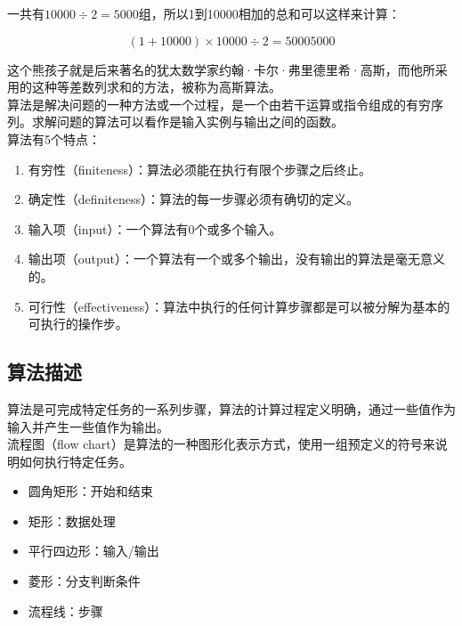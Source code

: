 一共有$ 10000 \div 2 = 5000 $组，所以1到10000相加的总和可以这样来计算：

$$
	(1 + 10000) \times 10000 \div 2 = 50005000
$$

这个熊孩子就是后来著名的犹太数学家约翰·卡尔·弗里德里希·高斯，而他所采用的这种等差数列求和的方法，被称为高斯算法。 \\

算法是解决问题的一种方法或一个过程，是一个由若干运算或指令组成的有穷序列。求解问题的算法可以看作是输入实例与输出之间的函数。 \\

算法有5个特点：

\begin{enumerate}
	\item 有穷性（finiteness）：算法必须能在执行有限个步骤之后终止。
	\item 确定性（definiteness）：算法的每一步骤必须有确切的定义。
	\item 输入项（input）：一个算法有0个或多个输入。
	\item 输出项（output）：一个算法有一个或多个输出，没有输出的算法是毫无意义的。
	\item 可行性（effectiveness）：算法中执行的任何计算步骤都是可以被分解为基本的可执行的操作步。
\end{enumerate}

\subsection{算法描述}

算法是可完成特定任务的一系列步骤，算法的计算过程定义明确，通过一些值作为输入并产生一些值作为输出。 \\

流程图（flow chart）是算法的一种图形化表示方式，使用一组预定义的符号来说明如何执行特定任务。

\begin{itemize}
	\item 圆角矩形：开始和结束
	\item 矩形：数据处理
	\item 平行四边形：输入/输出
	\item 菱形：分支判断条件
	\item 流程线：步骤
\end{itemize}

